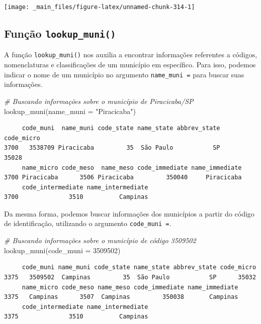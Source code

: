 \documentclass[
  brazilian,
]{book}
\newenvironment{Shaded}{\begin{snugshade}}{\end{snugshade}}
\newcommand{\AttributeTok}[1]{\textcolor[rgb]{0.77,0.63,0.00}{#1}}
\newcommand{\CommentTok}[1]{\textcolor[rgb]{0.56,0.35,0.01}{\textit{#1}}}
\newcommand{\DecValTok}[1]{\textcolor[rgb]{0.00,0.00,0.81}{#1}}
\newcommand{\FunctionTok}[1]{\textcolor[rgb]{0.00,0.00,0.00}{#1}}
\newcommand{\NormalTok}[1]{#1}
\newcommand{\StringTok}[1]{\textcolor[rgb]{0.31,0.60,0.02}{#1}}
\begin{document}
\begin{center}\texttt{[image: \_main\_files/figure-latex/unnamed-chunk-314-1]} \end{center}

\hypertarget{funuxe7uxe3o-lookup_muni}{%
\subsection{\texorpdfstring{Função \texttt{lookup\_muni()}}{Função lookup\_muni()}}\label{funuxe7uxe3o-lookup_muni}}

A função \texttt{lookup\_muni()} nos auxilia a encontrar informações referentes a códigos, nomenclaturas e classificações de um município em específico. Para isso, podemos indicar o nome de um município no argumento \texttt{name\_muni\ =} para buscar suas informações.

\begin{Shaded}
\begin{Highlighting}[]
\CommentTok{\# Buscando informações sobre o município de Piracicaba/SP}
\FunctionTok{lookup\_muni}\NormalTok{(}\AttributeTok{name\_muni =} \StringTok{"Piracicaba"}\NormalTok{)}
\end{Highlighting}
\end{Shaded}

\begin{verbatim}
     code_muni  name_muni code_state name_state abbrev_state code_micro
3700   3538709 Piracicaba         35  São Paulo           SP      35028
     name_micro code_meso  name_meso code_immediate name_immediate
3700 Piracicaba      3506 Piracicaba         350040     Piracicaba
     code_intermediate name_intermediate
3700              3510          Campinas
\end{verbatim}

Da mesma forma, podemos buscar informações dos municípios a partir do código de identificação, utilizando o argumento \texttt{code\_muni\ =}.

\begin{Shaded}
\begin{Highlighting}[]
\CommentTok{\# Buscando informações sobre o município de código 3509502}
\FunctionTok{lookup\_muni}\NormalTok{(}\AttributeTok{code\_muni =} \DecValTok{3509502}\NormalTok{)}
\end{Highlighting}
\end{Shaded}

\begin{verbatim}
     code_muni name_muni code_state name_state abbrev_state code_micro
3375   3509502  Campinas         35  São Paulo           SP      35032
     name_micro code_meso name_meso code_immediate name_immediate
3375   Campinas      3507  Campinas         350038       Campinas
     code_intermediate name_intermediate
3375              3510          Campinas
\end{verbatim}
\end{document}
